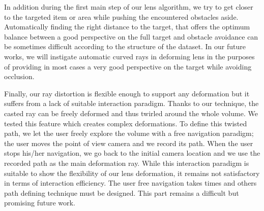 In addition during the first main step of our lens algorithm, we try to get closer to the targeted item or area while pushing the encountered obstacles aside. Automatically finding the right distance to the target, that offers the optimum balance between a good perspective on the full target and obstacle avoidance can be sometimes difficult according to the structure of the dataset. In our future works, we will instigate automatic curved rays in deforming lens in the purposes of providing in most cases a very good perspective on the target while avoiding occlusion. 

Finally, our ray distortion is flexible enough to support any deformation but it suffers from a lack of suitable interaction paradigm. Thanks to our technique, the casted ray can be freely deformed and thus twirled around the whole volume. We tested this feature which creates complex deformations. To define this twisted path, we let the user freely explore the volume with a free navigation paradigm; the user moves the point of view camera and we record its path. When the user stops his/her navigation, we go back to the initial camera location and we use the recorded path as the main deformation ray. While this interaction paradigm is suitable to show the flexibility of our lens deformation, it remains not satisfactory in terms of interaction efficiency. The user free navigation takes times and others path defining technique must be designed. This part remains a difficult but promising future work.